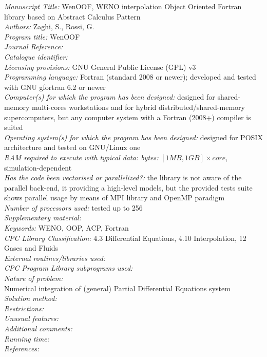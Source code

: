\documentclass[pdftex,preprint,3p,times,numbers]{elsarticle}
\begin{document}
\begin{small}
\noindent
\emph{Manuscript Title:} WenOOF, WENO interpolation Object Oriented Fortran library based on Abstract Calculus Pattern \\
\emph{Authors:} Zaghi, S., Rossi, G. \\
\emph{Program title:} WenOOF \\
\emph{Journal Reference:} \\
\emph{Catalogue identifier:} \\
\emph{Licensing provisions:} GNU General Public License (GPL) v3 \\
\emph{Programming language:} Fortran (standard 2008 or newer); developed and tested with GNU gfortran 6.2 or newer \\
\emph{Computer(s) for which the program has been designed:} designed for shared-memory multi-cores workstations and for hybrid distributed/shared-memory supercomputers, but any computer system with a Fortran (2008+) compiler is suited \\
\emph{Operating system(s) for which the program has been designed:} designed for POSIX architecture and tested on GNU/Linux one \\
\emph{RAM required to execute with typical data: bytes:} $[1MB,1GB]\times core$, simulation-dependent \\
\emph{Has the code been vectorised or parallelized?:} the library is not aware of the parallel back-end, it providing a high-level models, but the provided tests suite shows parallel usage by means of MPI library and OpenMP paradigm \\
\emph{Number of processors used:} tested up to 256 \\
\emph{Supplementary material:}    \\
\emph{Keywords:} WENO, OOP, ACP, Fortran \\
\emph{CPC Library Classification:} 4.3 Differential Equations, 4.10 Interpolation, 12 Gases and Fluids \\
\emph{External routines/libraries used:} \\
\emph{CPC Program Library subprograms used:} \\
\emph{Nature of problem:} \\
Numerical integration of (general) Partial Differential Equations system \\
\emph{Solution method:} \\
\emph{Restrictions:} \\
\emph{Unusual features:} \\
\emph{Additional comments:} \\
\emph{Running time:} \\
\emph{References:} \\
\end{small}
\end{document}
